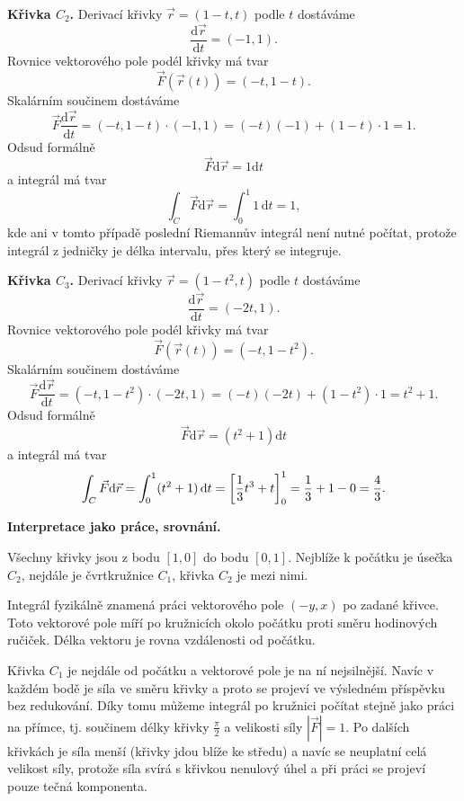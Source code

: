 \stranka

\textbf{Křivka $C_2$.}
Derivací křivky $\vec r=(1-t,t)$ podle $t$ dostáváme
$$\frac{\mathrm d\vec r}{\mathrm dt}=(-1,1).$$
Rovnice vektorového pole podél křivky má tvar
$$\vec F(\vec r(t))=(-t,1-t).$$
Skalárním součinem dostáváme
$$\vec F \frac{\mathrm d\vec r}{\mathrm dt}=
(-t,1- t)\cdot (-1,1) = (-t)(-1)+(1-t)\cdot 1 =1.
$$
Odsud formálně $$\vec F\mathrm d\vec r=1\mathrm dt$$
a integrál má tvar
$$\int_C\vec F\mathrm d\vec r=\int_0^{1}1\,\mathrm dt=1,$$
kde ani v tomto případě poslední Riemannův integrál není nutné počítat, protože integrál z jedničky je délka intervalu, přes který se integruje.

\stranka

\textbf{Křivka $C_3$.}
Derivací křivky $\vec r=(1-t^2,t)$ podle $t$ dostáváme
$$\frac{\mathrm d\vec r}{\mathrm dt}=(-2t,1).$$
Rovnice vektorového pole podél křivky má tvar
$$\vec F(\vec r(t))=(-t,1-t^2).$$
Skalárním součinem dostáváme
$$\vec F \frac{\mathrm d\vec r}{\mathrm dt}=
(-t,1- t^2)\cdot (-2t,1) = (-t)(-2t)+(1-t^2)\cdot 1 =t^2+1.
$$
Odsud formálně $$\vec F\mathrm d\vec r=(t^2+1)\mathrm dt$$
a integrál má tvar
$$\int_C\vec F\mathrm d\vec r=\int_0^{1}(t^2+1)\,\mathrm dt=
\qty[\frac 13 t^3 + t]_0^1 = \frac 13 + 1 - 0 =\frac 43.
$$

\stranka


\textbf{Interpretace jako práce, srovnání.}

Všechny křivky jsou z bodu $[1,0]$ do bodu $[0,1]$. Nejblíže k počátku je úsečka $C_2$, nejdále je čvrtkružnice $C_1$, křivka $C_2$ je mezi nimi.

Integrál fyzikálně znamená práci vektorového pole $(-y,x)$ po zadané křivce. Toto vektorové pole míří po kružnicích okolo počátku proti směru hodinových ručiček. Délka vektoru je rovna vzdálenosti od počátku.

Křivka $C_1$ je nejdále od počátku a vektorové pole je na ní nejsilnější. Navíc v každém bodě je síla ve směru křivky a proto se projeví ve výsledném příspěvku bez redukování. Díky tomu můžeme integrál po kružnici počítat stejně jako práci na přímce, tj. součinem délky  křivky $\frac \pi 2$ a velikosti síly $|\vec F|=1$. Po dalších křivkách je síla menší (křivky jdou blíže ke středu) a navíc se neuplatní celá velikost síly, protože síla svírá s křivkou nenulový úhel a při práci se projeví pouze tečná komponenta.


\stranka


